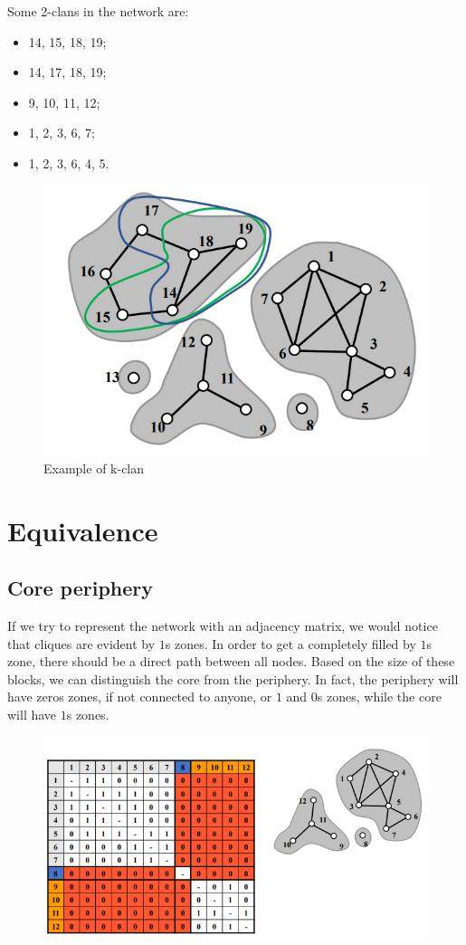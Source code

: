 \documentclass[
  notitlepage,
  onecolumn,
  openany]{book}
\providecommand{\tightlist}{%
  \setlength{\itemsep}{0pt}\setlength{\parskip}{0pt}}
\begin{document}
Some 2-clans in the network are:

\begin{itemize}
\tightlist
\item
  14, 15, 18, 19;
\item
  14, 17, 18, 19;
\item
  9, 10, 11, 12;
\item
  1, 2, 3, 6, 7;
\item
  1, 2, 3, 6, 4, 5.
\end{itemize}

\begin{figure}[h!]

{\centering \includegraphics[width=0.5\linewidth]{images/11-Subgroups and Structural Equivalence/Untitled 2} 

}

\caption{Example of k-clan}\label{fig:unnamed-chunk-84}
\end{figure}

\hypertarget{equivalence}{%
\section{Equivalence}\label{equivalence}}

\hypertarget{core-periphery}{%
\subsection{Core periphery}\label{core-periphery}}

If we try to represent the network with an adjacency matrix, we would notice that cliques are evident by \(1\)s zones. In order to get a completely filled by \(1\)s zone, there should be a direct path between all nodes. Based on the size of these blocks, we can distinguish the core from the periphery. In fact, the periphery will have zeros zones, if not connected to anyone, or \(1\) and \(0\)s zones, while the core will have \(1\)s zones.

\begin{figure}[h!]

{\centering \includegraphics[width=0.6\linewidth]{images/11-Subgroups and Structural Equivalence/Untitled 3} 

}

\end{figure}
\end{document}
